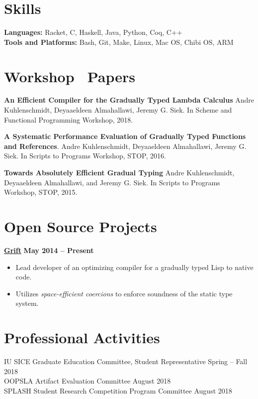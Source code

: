\documentclass[resmargin,line]{res}
\begin{document}
\begin{resume}

\section{\sc Skills}
{\bf Languages:} Racket, C, Haskell, Java, Python, Coq, C++\\
{\bf Tools and Platforms:} Bash, Git, Make, Linux, Mac OS, Chibi OS, ARM

\section{\sc Workshop \, Papers}

{\bf An Efficient Compiler for the Gradually Typed Lambda Calculus}
Andre Kuhlenschmidt, Deyaaeldeen Almahallawi, Jeremy G. Siek.
In Scheme and Functional Programming Workshop, 2018.

{\bf A Systematic Performance Evaluation of Gradually Typed Functions
  and References}.
%
Andre Kuhlenschmidt, Deyaaeldeen Almahallawi, Jeremy G. Siek.
%
In Scripts to Programs Workshop, STOP, 2016.

{\bf Towards Absolutely Efficient Gradual Typing}
%
Andre Kuhlenschmidt, Deyaaeldeen Almahallawi, and Jeremy G. Siek.
%
In Scripts to Programs Workshop, STOP, 2015.

\section{\sc Open Source Projects}

{\bf \href{github.com/Gradual-Typing/Grift/}{Grift}}
\hfill {\bf May 2014 -- Present}\\
\vspace*{-.35cm}
\begin{itemize}
\item Lead developer of an optimizing compiler for a gradually typed Lisp to
  native code.
\item Utilizes {\em space-efficient coercions} to enforce
  soundness of the static type system.
\end{itemize}


\section{\sc Professional Activities}

IU SICE Graduate Education Committee, Student Representative
\hfill Spring -- Fall 2018\\
OOPSLA Artifact Evaluation Committee \hfill August 2018\\
SPLASH Student Research Competition Program Committee \hfill August 2018\\

\end{resume}
\end{document}

